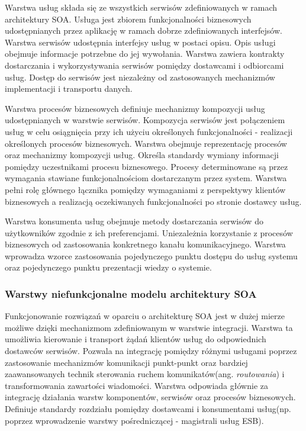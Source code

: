 			Warstwa usług składa się ze wszystkich serwisów zdefiniowanych w ramach architektury SOA. Usługa jest zbiorem funkcjonalności biznesowych udostępnianych przez aplikację w ramach dobrze zdefiniowanych interfejsów. Warstwa serwisów udostępnia interfejsy usług w postaci opisu. Opis usługi obejmuje informacje potrzebne do jej wywołania. Warstwa zawiera kontrakty dostarczania i wykorzystywania serwisów pomiędzy dostawcami i odbiorcami usług. Dostęp do serwisów jest niezależny od zastosowanych mechanizmów implementacji i transportu danych. 

			Warstwa procesów biznesowych definiuje mechanizmy kompozycji usług udostępnianych w warstwie serwisów. Kompozycja serwisów jest połączeniem usług w celu osiągnięcia przy ich użyciu określonych funkcjonalności - realizacji określonych procesów biznesowych. Warstwa obejmuje reprezentację procesów oraz mechanizmy kompozycji usług. Określa standardy wymiany informacji pomiędzy uczestnikami procesu biznesowego. Procesy determinowane są przez wymagania stawiane funkcjonalnościom dostarczanym przez system. Warstwa pełni rolę głównego łącznika pomiędzy wymaganiami z perspektywy klientów biznesowych a realizacją oczekiwanych funkcjonalności po stronie dostawcy usług.

			Warstwa konsumenta usług obejmuje metody dostarczania serwisów do użytkowników zgodnie z ich preferencjami. Uniezależnia korzystanie z procesów biznesowych od zastosowania konkretnego kanału komunikacyjnego. Warstwa wprowadza wzorce zastosowania pojedynczego punktu dostępu do usług systemu oraz pojedynczego punktu prezentacji wiedzy o systemie.

		\subsubsection{Warstwy niefunkcjonalne modelu architektury SOA}

			Funkcjonowanie rozwiązań w oparciu o architekturę SOA jest w dużej mierze możliwe dzięki mechanizmom zdefiniowanym w warstwie integracji. Warstwa ta umożliwia kierowanie i transport żądań klientów usług do odpowiednich dostawców serwisów. Pozwala na integrację pomiędzy różnymi usługami poprzez zastosowanie mechanizmów komunikacji punkt-punkt oraz bardziej zaawansowanych technik sterowania ruchem komunikatów(ang. \textit{routowania}) i transformowania zawartości wiadomości. Warstwa odpowiada głównie za integrację działania warstw komponentów, serwisów oraz procesów biznesowych. Definiuje standardy rozdziału pomiędzy dostawcami i konsumentami usług(np. poprzez wprowadzenie warstwy pośredniczącej - magistrali usług ESB)\cite{Arsanjani07}.

